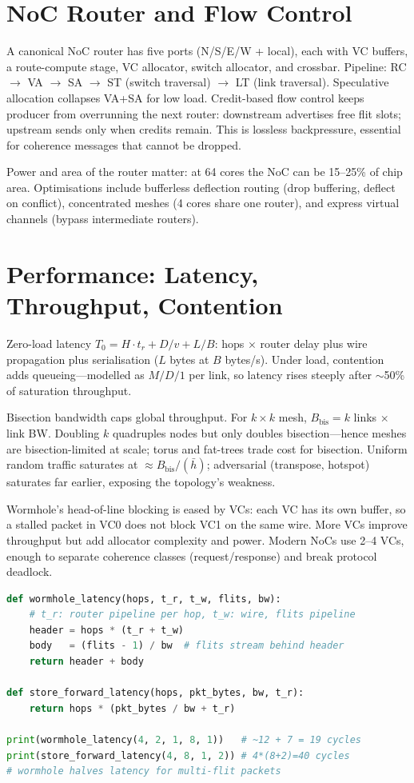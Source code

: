 \section{NoC Router and Flow Control}
A canonical NoC router has five ports (N/S/E/W + local), each with VC buffers, a
route-compute stage, VC allocator, switch allocator, and crossbar. Pipeline: RC $\to$ VA
$\to$ SA $\to$ ST (switch traversal) $\to$ LT (link traversal). Speculative allocation
collapses VA+SA for low load. Credit-based flow control keeps producer from overrunning
the next router: downstream advertises free flit slots; upstream sends only when credits
remain. This is lossless backpressure, essential for coherence messages that cannot be
dropped.

Power and area of the router matter: at 64 cores the NoC can be 15--25\% of chip area.
Optimisations include bufferless deflection routing (drop buffering, deflect on
conflict), concentrated meshes (4 cores share one router), and express virtual channels
(bypass intermediate routers).

\section{Performance: Latency, Throughput, Contention}
Zero-load latency $T_0 = H\cdot t_r + D/v + L/B$: hops $\times$ router delay plus wire
propagation plus serialisation ($L$ bytes at $B$ bytes/s). Under load, contention adds
queueing---modelled as $M/D/1$ per link, so latency rises steeply after $\sim$50\% of
saturation throughput.

Bisection bandwidth caps global throughput. For $k\times k$ mesh, $B_{\text{bis}}=k$
links $\times$ link BW. Doubling $k$ quadruples nodes but only doubles bisection---hence
meshes are bisection-limited at scale; torus and fat-trees trade cost for bisection.
Uniform random traffic saturates at $\approx B_{\text{bis}}/(\bar{h})$; adversarial
(transpose, hotspot) saturates far earlier, exposing the topology's weakness.

Wormhole's head-of-line blocking is eased by VCs: each VC has its own buffer, so a
stalled packet in VC0 does not block VC1 on the same wire. More VCs improve throughput
but add allocator complexity and power. Modern NoCs use 2--4 VCs, enough to separate
coherence classes (request/response) and break protocol deadlock.

\begin{lstlisting}[language=Python, caption={Wormhole flit pipeline: latency vs. store-and-forward.}]
def wormhole_latency(hops, t_r, t_w, flits, bw):
    # t_r: router pipeline per hop, t_w: wire, flits pipeline
    header = hops * (t_r + t_w)
    body   = (flits - 1) / bw  # flits stream behind header
    return header + body

def store_forward_latency(hops, pkt_bytes, bw, t_r):
    return hops * (pkt_bytes / bw + t_r)

print(wormhole_latency(4, 2, 1, 8, 1))   # ~12 + 7 = 19 cycles
print(store_forward_latency(4, 8, 1, 2)) # 4*(8+2)=40 cycles
# wormhole halves latency for multi-flit packets
\end{lstlisting}

